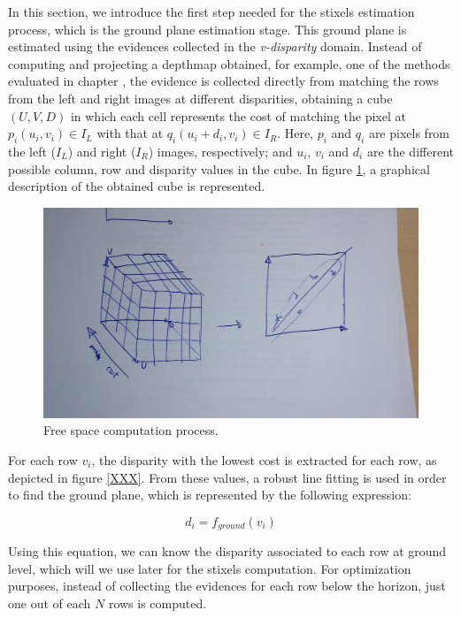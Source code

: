 In this section, we introduce the first step needed for the stixels estimation process, which is the ground plane estimation stage. This ground plane is estimated using the evidences collected in the \emph{v-disparity} domain. Instead of computing and projecting a depthmap obtained, for example, one of the methods evaluated in chapter , the evidence is collected directly from matching the rows from the left and right images at different disparities, obtaining a cube $(U, V, D)$ in which each cell represents the cost of matching the pixel at $p_i(u_i, v_i) \in I_L$ with that at $q_i(u_i + d_i, v_i) \in I_R$. Here, $p_i$ and $q_i$ are pixels from the left ($I_L$) and right ($I_R$) images, respectively; and $u_i$, $v_i$ and $d_i$ are the different possible column, row and disparity values in the cube. In figure \ref{fig:cp04_freespace}, a graphical description of the obtained cube is represented.

\begin{figure}[h!]
  \centering
  \includegraphics{freespace}
  \caption{Free space computation process.}\label{fig:cp04_freespace}
\end{figure}

For each row $v_i$, the disparity with the lowest cost is extracted for each row, as depicted in figure \ref{XXX}. From these values, a robust line fitting is used in order to find the ground plane, which is represented by the following expression:

\begin{equation}\label{eq:cp04_ground_plane_function}
  d_i = f_{ground}(v_i)
\end{equation}

Using this equation, we can know the disparity associated to each row at ground level, which will we use later for the stixels computation. For optimization purposes, instead of collecting the evidences for each row below the horizon, just one out of each $N$ rows is computed. 

